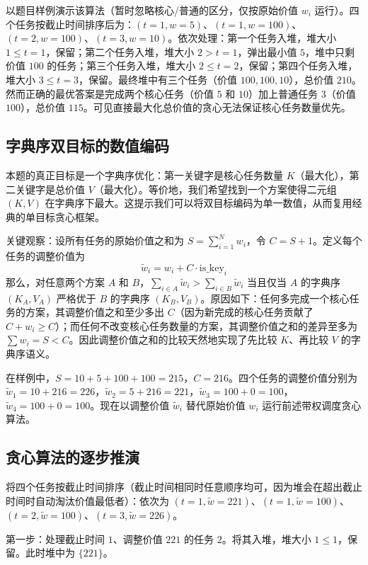 以题目样例演示该算法（暂时忽略核心/普通的区分，仅按原始价值 $w_i$ 运行）。四个任务按截止时间排序后为：$(t=1,w=5)$、$(t=1,w=100)$、$(t=2,w=100)$、$(t=3,w=10)$。依次处理：第一个任务入堆，堆大小 $1 \le t=1$，保留；第二个任务入堆，堆大小 $2 > t=1$，弹出最小值 $5$，堆中只剩价值 $100$ 的任务；第三个任务入堆，堆大小 $2 \le t=2$，保留；第四个任务入堆，堆大小 $3 \le t=3$，保留。最终堆中有三个任务（价值 $100,100,10$），总价值 $210$。然而正确的最优答案是完成两个核心任务（价值 $5$ 和 $10$）加上普通任务 $3$（价值 $100$），总价值 $115$。可见直接最大化总价值的贪心无法保证核心任务数量优先。

\subsection{字典序双目标的数值编码}

本题的真正目标是一个字典序优化：第一关键字是核心任务数量 $K$（最大化），第二关键字是总价值 $V$（最大化）。等价地，我们希望找到一个方案使得二元组 $(K, V)$ 在字典序下最大。这提示我们可以将双目标编码为单一数值，从而复用经典的单目标贪心框架。

关键观察：设所有任务的原始价值之和为 $S = \sum_{i=1}^{N} w_i$，令 $C = S + 1$。定义每个任务的调整价值为
\[
\tilde{w}_i = w_i + C \cdot \text{is\_key}_i
\]
那么，对任意两个方案 $A$ 和 $B$，$\sum_{i \in A} \tilde{w}_i > \sum_{i \in B} \tilde{w}_i$ 当且仅当 $A$ 的字典序 $(K_A, V_A)$ 严格优于 $B$ 的字典序 $(K_B, V_B)$。原因如下：任何多完成一个核心任务的方案，其调整价值之和至少多出 $C$（因为新完成的核心任务贡献了 $C + w_i \ge C$）；而任何不改变核心任务数量的方案，其调整价值之和的差异至多为 $\sum w_i = S < C$。因此调整价值之和的比较天然地实现了先比较 $K$、再比较 $V$ 的字典序语义。

在样例中，$S = 10 + 5 + 100 + 100 = 215$，$C = 216$。四个任务的调整价值分别为 $\tilde{w}_1 = 10 + 216 = 226$，$\tilde{w}_2 = 5 + 216 = 221$，$\tilde{w}_3 = 100 + 0 = 100$，$\tilde{w}_4 = 100 + 0 = 100$。现在以调整价值 $\tilde{w}_i$ 替代原始价值 $w_i$ 运行前述带权调度贪心算法。

\subsection{贪心算法的逐步推演}

将四个任务按截止时间排序（截止时间相同时任意顺序均可，因为堆会在超出截止时间时自动淘汰价值最低者）：依次为 $(t=1, \tilde{w}=221)$、$(t=1, \tilde{w}=100)$、$(t=2, \tilde{w}=100)$、$(t=3, \tilde{w}=226)$。

第一步：处理截止时间 $1$、调整价值 $221$ 的任务 $2$。将其入堆，堆大小 $1 \le 1$，保留。此时堆中为 $\{221\}$。

